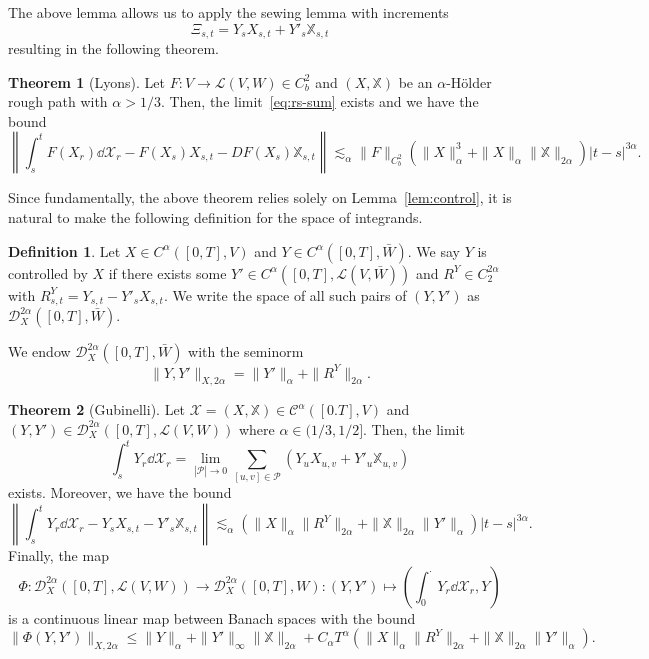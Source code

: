 \documentclass[]{article}
\theoremstyle{definition}
\newtheorem{theorem}{Theorem}
\theoremstyle{definition}
\newtheorem{definition}{Definition}
\begin{document}
The above lemma allows us to apply the sewing lemma with increments 
\[\Xi_{s, t} = Y_s X_{s, t} + Y'_s \mathbb{X}_{s, t}\]
resulting in the following theorem.

\begin{theorem}[Lyons]
  Let \(F : V \to \mathcal{L}(V, W) \in C^2_b\) and \((X, \mathbb{X})\) be an \(\alpha\)-H\"older rough path with \(\alpha > 1/3\).
  Then, the limit~\eqref{eq:rs-sum} exists and we have the bound
  \[\left\|\int_s^t F(X_r) \dd \mathcal{X}_r - F(X_s) X_{s, t} - DF(X_s) \mathbb{X}_{s, t}\right\|
    \lesssim_{\alpha}\|F\|_{C^2_b}(\|X\|^3_\alpha + \|X\|_\alpha\|\mathbb{X}\|_{2\alpha})|t - s|^{3\alpha}.\]
\end{theorem}

Since fundamentally, the above theorem relies solely on Lemma~\ref{lem:control}, it is natural to 
make the following definition for the space of integrands.

\begin{definition}
  Let \(X \in C^\alpha([0, T], V)\) and \(Y \in C^\alpha([0, T], \bar W)\). We say \(Y\) is controlled by \(X\) 
  if there exists some \(Y' \in C^\alpha([0, T], \mathcal{L}(V, \bar W))\) and \(R^Y \in C^{2\alpha}_2\) with 
  \(R^Y_{s, t} = Y_{s, t} - Y'_s X_{s, t}\). We write the space of all such pairs of \((Y, Y')\) as 
  \(\mathcal{D}^{2\alpha}_X([0, T], \bar W)\).
\end{definition}

We endow \(\mathcal{D}^{2\alpha}_X([0, T], \bar W)\) with the seminorm 
\[\|Y, Y'\|_{X, 2\alpha} = \|Y'\|_\alpha + \|R^Y\|_{2\alpha}.\]

\begin{theorem}[Gubinelli]
  Let \(\mathcal{X} = (X, \mathbb{X}) \in \mathcal{C}^\alpha([0. T], V)\) and 
  \((Y, Y') \in \mathcal{D}^{2\alpha}_X([0, T], \mathcal{L}(V, W))\) where \(\alpha \in (1/3, 1/2]\).
  Then, the limit 
  \[\int_s^t Y_r \dd \mathcal{X}_r = \lim_{|\mathcal{P}| \to 0} \sum_{[u, v] \in \mathcal{P}}\left(Y_u X_{u, v} + Y'_u \mathbb{X}_{u, v}\right)\]
  exists. Moreover, we have the bound 
  \[\left\| \int_s^t Y_r \dd \mathcal{X}_r - Y_s X_{s, t} - Y'_s \mathbb{X}_{s, t}\right\| 
    \lesssim_{\alpha} (\|X\|_{\alpha}\|R^Y\|_{2\alpha} + \|\mathbb{X}\|_{2\alpha}\|Y'\|_\alpha)|t - s|^{3\alpha}.\]
  Finally, the map 
  \[\Phi : \mathcal{D}^{2\alpha}_X([0, T], \mathcal{L}(V, W)) \to \mathcal{D}^{2\alpha}_X([0, T], W): 
    (Y, Y') \mapsto \left(\int_0^{\cdot} Y_r \dd \mathcal{X}_r, Y\right)\]
  is a continuous linear map between Banach spaces with the bound 
  \[\|\Phi(Y, Y')\|_{X, 2\alpha} \le \|Y\|_\alpha + \|Y'\|_\infty\|\mathbb{X}\|_{2\alpha} + 
    C_\alpha T^\alpha(\|X\|_\alpha \|R^Y\|_{2\alpha} + \|\mathbb{X}\|_{2\alpha}\|Y'\|_{\alpha}).\] 
\end{theorem}
\end{document}

